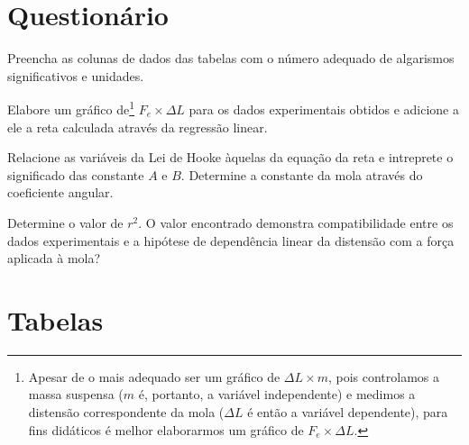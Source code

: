\vspace{5mm}

\section{Questionário}

\begin{question}[type={exam}]
Preencha as colunas de dados das tabelas com o número adequado de algarismos significativos e unidades.
\end{question}

\begin{question}[type={exam}] 
Elabore um gráfico de\footnote{Apesar de o mais adequado ser um gráfico de $\Delta L \times m$, pois controlamos a massa suspensa ($m$ é, portanto, a variável independente) e medimos a distensão correspondente da mola ($\Delta L$ é então a variável dependente), para fins didáticos é melhor elaborarmos um gráfico de  $F_e \times \Delta L$.} $F_e \times \Delta L$ para os dados experimentais obtidos e adicione a ele a reta calculada através da regressão linear.
\end{question}

\begin{question}[type={exam}]
Relacione as variáveis da Lei de Hooke àquelas da equação da reta e intreprete o significado das constante $A$ e $B$. Determine a constante da mola através do coeficiente angular.
\end{question}

\begin{question}[type={exam}]
Determine o valor de $r^2$. O valor encontrado demonstra compatibilidade entre os dados experimentais e a hipótese de dependência linear da distensão com a força aplicada à mola?
\end{question}
\vfill

\pagebreak
\section{Tabelas}

